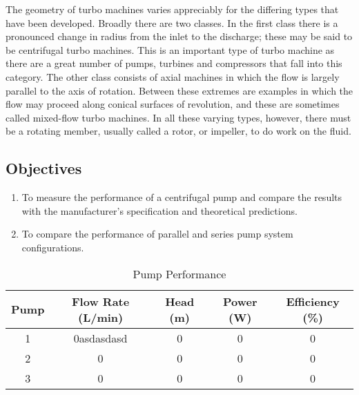 The geometry of turbo machines varies appreciably for the differing types that have been developed. Broadly there are two classes. In the first class there is a pronounced change in radius from the inlet to the discharge; these may be said to be centrifugal turbo machines. This is an important type of turbo machine as there are a great number of pumps, turbines and compressors that fall into this category. The other class consists of axial machines in which the flow is largely parallel to the axis of rotation. Between these extremes are examples in which the flow may proceed along conical surfaces of revolution, and these are sometimes called mixed-flow turbo machines. In all these varying types, however, there must be a rotating member, usually called a rotor, or impeller, to do work on the fluid.

\subsection{Objectives}
\begin{enumerate}
    \item To measure the performance of a centrifugal pump and compare the results with the manufacturer’s specification and theoretical predictions.
    \item To compare the performance of parallel and series pump system configurations.
\end{enumerate}

\begin{table}[h]
    \centering
    \begin{tabular}{|c|c|c|c|c|}
    \hline
    \textbf{Pump} & \textbf{Flow Rate (L/min)} & \textbf{Head (m)} & \textbf{Power (W)} & \textbf{Efficiency (\%)} \\ \hline
    1            & 0asdasdasd                          & 0                & 0                  & 0                       \\ \hline
    2            & 0                          & 0                & 0                  & 0                       \\ \hline
    3            & 0                          & 0                & 0                  & 0                       \\ \hline
    \end{tabular}
    \caption{Pump Performance}
    \label{tab:pump_performance}
\end{table}
